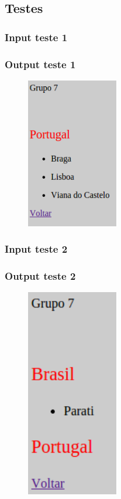 \subsection{Testes}
\label{seq:anex-enamex-test}
\subsubsection{Input teste 1}
\label{seq:anex-enamex-test-in01}


\subsubsection{Output teste 1}
\label{seq:anex-enamex-test-out01}

\begin{figure}[H]
\centering
\includegraphics[width=4cm]{anexos/2-2/output_teste1.png}
\end{figure}


\subsubsection{Input teste 2}
\label{seq:anex-enamex-test-in02}


\subsubsection{Output teste 2}
\label{seq:anex-enamex-test-out02}

\begin{figure}[H]
\centering
\includegraphics[width=4cm]{anexos/2-2/output_teste2.png}
\end{figure}

